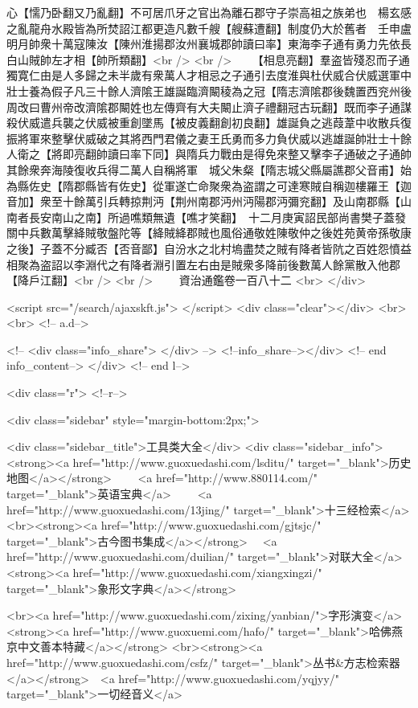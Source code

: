心【懦乃卧翻又乃亂翻】不可居爪牙之官出為離石郡守子崇高祖之族弟也　楊玄感之亂龍舟水殿皆為所焚詔江都更造凡數千艘【艘蘇遭翻】制度仍大於舊者　壬申盧明月帥衆十萬寇陳汝【陳州淮揚郡汝州襄城郡帥讀曰率】東海李子通有勇力先依長白山賊帥左才相【帥所類翻】<br />
<br />
　　【相息亮翻】羣盗皆殘忍而子通獨寛仁由是人多歸之未半歲有衆萬人才相忌之子通引去度淮與杜伏威合伏威選軍中壯士養為假子凡三十餘人濟隂王雄誕臨濟闞稜為之冠【隋志濟隂郡後魏置西兖州後周改曰曹州帝改濟隂郡闞姓也左傳齊有大夫闞止濟子禮翻冠古玩翻】既而李子通謀殺伏威遣兵襲之伏威被重創墜馬【被皮義翻創初良翻】雄誕負之逃葭葦中收散兵復振將軍來整擊伏威破之其將西門君儀之妻王氏勇而多力負伏威以逃雄誕帥壯士十餘人衛之【將即亮翻帥讀曰率下同】與隋兵力戰由是得免來整又擊李子通破之子通帥其餘衆奔海陵復收兵得二萬人自稱將軍　城父朱粲【隋志城父縣屬譙郡父音甫】始為縣佐史【隋郡縣皆有佐史】從軍遂亡命聚衆為盗謂之可達寒賊自稱迦樓羅王【迦音加】衆至十餘萬引兵轉掠荆沔【荆州南郡沔州沔陽郡沔彌兖翻】及山南郡縣【山南者長安南山之南】所過噍類無遺【噍才笑翻】　十二月庚寅詔民部尚書樊子蓋發關中兵數萬擊絳賊敬盤陀等【絳賊絳郡賊也風俗通敬姓陳敬仲之後姓苑黄帝孫敬康之後】子蓋不分臧否【否音鄙】自汾水之北村塢盡焚之賊有降者皆阬之百姓怨憤益相聚為盗詔以李淵代之有降者淵引置左右由是賊衆多降前後數萬人餘黨散入他郡【降戶江翻】<br />
<br />
　　資治通鑑卷一百八十二  <br>
   </div> 

<script src="/search/ajaxskft.js"> </script>
 <div class="clear"></div>
<br>
<br>
 <!-- a.d-->

 <!--
<div class="info_share">
</div> 
-->
 <!--info_share--></div>   <!-- end info_content-->
  </div> <!-- end l-->

<div class="r">   <!--r-->



<div class="sidebar"  style="margin-bottom:2px;">

 
<div class="sidebar_title">工具类大全</div>
<div class="sidebar_info">
<strong><a href="http://www.guoxuedashi.com/lsditu/" target="_blank">历史地图</a></strong>　　
<a href="http://www.880114.com/" target="_blank">英语宝典</a>　　
<a href="http://www.guoxuedashi.com/13jing/" target="_blank">十三经检索</a>　
<br><strong><a href="http://www.guoxuedashi.com/gjtsjc/" target="_blank">古今图书集成</a></strong>　
<a href="http://www.guoxuedashi.com/duilian/" target="_blank">对联大全</a>　<strong><a href="http://www.guoxuedashi.com/xiangxingzi/" target="_blank">象形文字典</a></strong>　

<br><a href="http://www.guoxuedashi.com/zixing/yanbian/">字形演变</a>　　<strong><a href="http://www.guoxuemi.com/hafo/" target="_blank">哈佛燕京中文善本特藏</a></strong>
<br><strong><a href="http://www.guoxuedashi.com/csfz/" target="_blank">丛书&方志检索器</a></strong>　<a href="http://www.guoxuedashi.com/yqjyy/" target="_blank">一切经音义</a>　　

